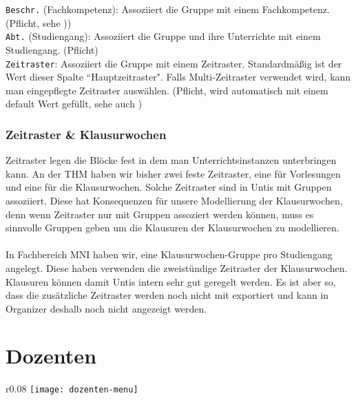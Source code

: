 \noindent
\texttt{Beschr.} (Fachkompetenz): Assoziiert die Gruppe mit einem Fachkompetenz. (Pflicht, sehe ))\\

\noindent
\texttt{Abt.} (Studiengang): Assoziiert die Gruppe und ihre Unterrichte mit einem Studiengang. (Pflicht)\\

\noindent
\texttt{Zeitraster}: Assoziiert die Gruppe mit einem Zeitraster. Standardmäßig ist der Wert dieser Spalte ``Hauptzeitraster". Falls Multi-Zeitraster verwendet wird, kann man eingepflegte Zeitraster auswählen. (Pflicht, wird automatisch mit einem default Wert gefüllt, sehe auch )

\subsubsection{Zeitraster \& Klausurwochen}
\label{sec:zeitraster}

Zeitraster legen die Blöcke fest in dem man Unterrichtsinstanzen unterbringen kann. An der THM haben wir bisher zwei feste Zeitraster, eine für Vorlesungen und eine für die Klausurwochen. Solche Zeitraster sind in Untis mit Gruppen assoziiert. Diese hat Konsequenzen für unsere Modellierung der Klausurwochen, denn wenn Zeitraster nur mit Gruppen assoziert werden können, muss es sinnvolle Gruppen geben um die Klausuren der Klausurwochen zu modellieren.\\
\\
In Fachbereich MNI haben wir, eine Klausurwochen-Gruppe pro Studiengang angelegt. Diese haben verwenden die zweistündige Zeitraster der Klausurwochen. Klausuren können damit Untis intern sehr gut geregelt werden. Es ist aber so, dass die zusätzliche Zeitraster werden noch nicht mit exportiert und kann in Organizer deshalb noch nicht angezeigt werden.\\

\section{Dozenten}

\begin{wrapfigure}{r}{0.08\textwidth}
	\vspace{-70pt}
	\texttt{[image: dozenten-menu]}
\end{wrapfigure}

\vspace{25pt}


